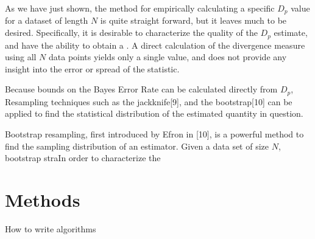 \documentclass{article}
\begin{document}
	As we have just shown, the method for empirically calculating a specific $D_p$ value for a dataset of length $N$ is quite straight forward, but it leaves much to be desired. Specifically, it is desirable to characterize the quality of the $D_p$ estimate, and have the ability to obtain a . A direct calculation of the divergence measure using all $N$ data points yields only a single value, and does not provide any insight into the error or spread of  the statistic. 
	
	Because bounds on the Bayes Error Rate can be calculated directly from $D_p$, Resampling techniques such as the jackknife[9], and the bootstrap[10] can be applied to find the statistical distribution of the estimated quantity in question. 
	
	
	
	
	Bootstrap resampling, first introduced by Efron in [10], is a powerful method to find the sampling distribution of an estimator. Given a data set of size $N$, bootstrap  straIn order to characterize the 

	
	
	\section{Methods}
	\begin{algorithm}[H]
	\caption{How to write algorithms}
	\end{algorithm}
	
\end{document}

